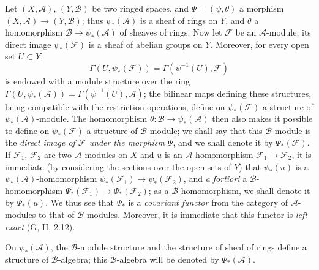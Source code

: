 \begin{env}[4.2.1]
\label{0.4.2.1}
Let $(X,\mathcal{A})$, $(Y,\mathcal{B})$ be two ringed spaces, and
$\Psi=(\psi,\theta)$ a morphism
$(X,\mathcal{A})\to(Y,\mathcal{B})$; thus $\psi_*(\mathcal{A})$ is a
sheaf of rings on $Y$, and $\theta$ a homomorphism
$\mathcal{B}\to\psi_*(\mathcal{A})$ of sheaves of rings. Now let
$\mathcal{F}$ be an $\mathcal{A}$-module; its direct image
$\psi_*(\mathcal{F})$ is a sheaf of abelian groups on $Y$. Moreover,
for every open set $U\subset Y$,
\[
  \Gamma(U,\psi_*(\mathcal{F}))
  =\Gamma(\psi^{-1}(U),\mathcal{F})
\]
is endowed with a module structure over the ring
$\Gamma(U,\psi_*(\mathcal{A}))=\Gamma(\psi^{-1}(U),\mathcal{A})$; the
bilinear maps defining these structures, being compatible
with the restriction operations, define on $\psi_*(\mathcal{F})$ a
structure of $\psi_*(\mathcal{A})$-module. The homomorphism
$\theta:\mathcal{B}\to\psi_*(\mathcal{A})$ then also makes it possible to define on
$\psi_*(\mathcal{F})$ a structure of $\mathcal{B}$-module; we shall say that
this $\mathcal{B}$-module is the \emph{direct image of $\mathcal{F}$ under the
morphism $\Psi$}, and we shall denote it by $\Psi_*(\mathcal{F})$. If
$\mathcal{F}_1$, $\mathcal{F}_2$ are two $\mathcal{A}$-modules on $X$ and
$u$ is an $\mathcal{A}$-homomorphism $\mathcal{F}_1\to\mathcal{F}_2$, it is
immediate (by considering the sections over the open sets of $Y$) that
$\psi_*(u)$ is a $\psi_*(\mathcal{A})$-homomorphism
$\psi_*(\mathcal{F}_1)\to\psi_*(\mathcal{F}_2)$, and \emph{a fortiori} a
$\mathcal{B}$-homomorphism
$\Psi_*(\mathcal{F}_1)\to\Psi_*(\mathcal{F}_2)$; as a
$\mathcal{B}$-homomorphism, we shall denote it by $\Psi_*(u)$. We thus see that
$\Psi_*$ is a \emph{covariant functor} from the category of
$\mathcal{A}$-modules to that of $\mathcal{B}$-modules. Moreover, it is
immediate that this functor is \emph{left exact} (G, II, 2.12).

On $\psi_*(\mathcal{A})$, the $\mathcal{B}$-module structure and the
structure of sheaf of rings define a structure of
$\mathcal{B}$-algebra; this $\mathcal{B}$-algebra will be denoted by
$\Psi_*(\mathcal{A})$.
\end{env}

